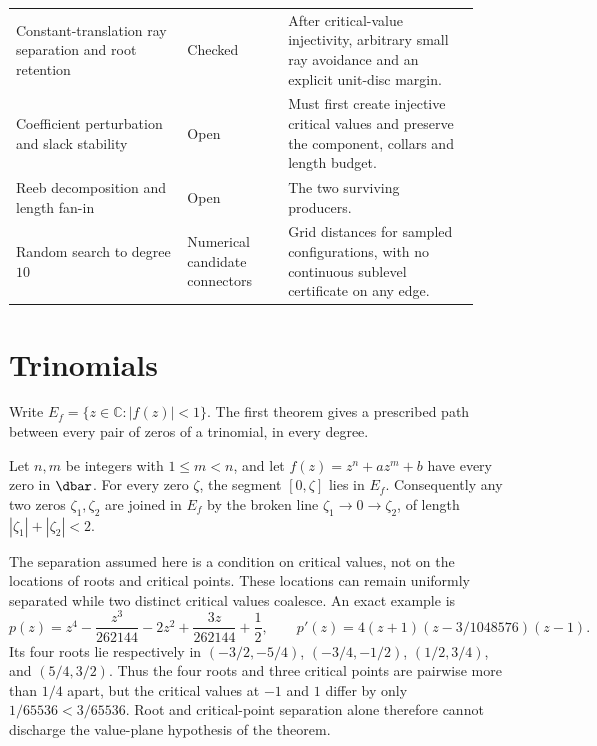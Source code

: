 \begin{longtable}{@{}
  >{\raggedright\arraybackslash}p{0.34\linewidth}
  >{\raggedright\arraybackslash}p{0.20\linewidth}
  >{\raggedright\arraybackslash}p{0.38\linewidth}@{}}
Constant-translation ray separation and root retention & Checked & After critical-value injectivity, arbitrary small ray avoidance and an explicit unit-disc margin. \\
Coefficient perturbation and slack stability & Open & Must first create injective critical values and preserve the component, collars and length budget. \\
Reeb decomposition and length fan-in & Open & The two surviving producers. \\
Random search to degree $10$ & Numerical candidate connectors & Grid distances for sampled configurations, with no continuous sublevel certificate on any edge. \\
\bottomrule
\end{longtable}
\endgroup

\section{Trinomials}
\label{sec:trinomials}

Write $E_f=\{z\in\mathbb C:|f(z)|<1\}$.  The first theorem gives a prescribed
path between every pair of zeros of a trinomial, in every degree.

\begin{theorem}
\label{res:trinomial-all-degree}
Let $n,m$ be integers with $1\le m<n$, and let $f(z)=z^n+az^m+b$ have every
zero in $\dbar$.  For every zero $\zeta$, the segment $[0,\zeta]$ lies in
$E_f$.  Consequently any two zeros $\zeta_1,\zeta_2$ are joined in $E_f$ by
the broken line $\zeta_1\to0\to\zeta_2$, of length $|\zeta_1|+|\zeta_2|<2$.
\end{theorem}

The separation assumed here is a condition on critical values, not on the
locations of roots and critical points.  These locations can remain uniformly
separated while two distinct critical values coalesce.  An exact example is
\[
 p(z)=z^4-\frac{z^3}{262144}-2z^2+\frac{3z}{262144}+\frac12,
 \qquad
 p'(z)=4(z+1)(z-3/1048576)(z-1).
\]
Its four roots lie respectively in $(-3/2,-5/4)$, $(-3/4,-1/2)$,
$(1/2,3/4)$, and $(5/4,3/2)$.  Thus the four roots and three critical points
are pairwise more than $1/4$ apart, but the critical values at $-1$ and $1$
differ by only $1/65536<3/65536$.  Root and critical-point separation alone
therefore cannot discharge the value-plane hypothesis of the theorem.

